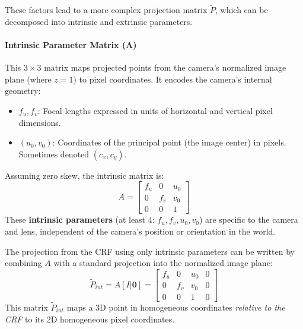 These factors lead to a more complex projection matrix $\tilde{P}$, which can be decomposed into intrinsic and extrinsic parameters.

\paragraph{Intrinsic Parameter Matrix (A)}
This $3 \times 3$ matrix maps projected points from the camera's normalized image plane (where $z=1$) to pixel coordinates. It encodes the camera's internal geometry:
\begin{itemize}
    \item $f_u, f_v$: Focal lengths expressed in units of horizontal and vertical pixel dimensions.
    \item $(u_0, v_0)$: Coordinates of the principal point (the image center) in pixels. Sometimes denoted $(c_x, c_y)$.
\end{itemize}
Assuming zero skew, the intrinsic matrix is:
\[
A =
\begin{bmatrix}
  f_u & 0 & u_0 \\
  0 & f_v & v_0 \\
  0 & 0 & 1
\end{bmatrix}
\]
These \textbf{intrinsic parameters} (at least 4: $f_u, f_v, u_0, v_0$) are specific to the camera and lens, independent of the camera's position or orientation in the world.

The projection from the CRF using only intrinsic parameters can be written by combining $A$ with a standard projection into the normalized image plane:
\[
\tilde{P}_{int} = A [I | \mathbf{0}] =
\begin{bmatrix}
  f_u & 0 & u_0 & 0 \\
  0 & f_v & v_0 & 0 \\
  0 & 0 & 1 & 0
\end{bmatrix}
\]
This matrix $\tilde{P}_{int}$ maps a 3D point in homogeneous coordinates \emph{relative to the CRF} to its 2D homogeneous pixel coordinates.

